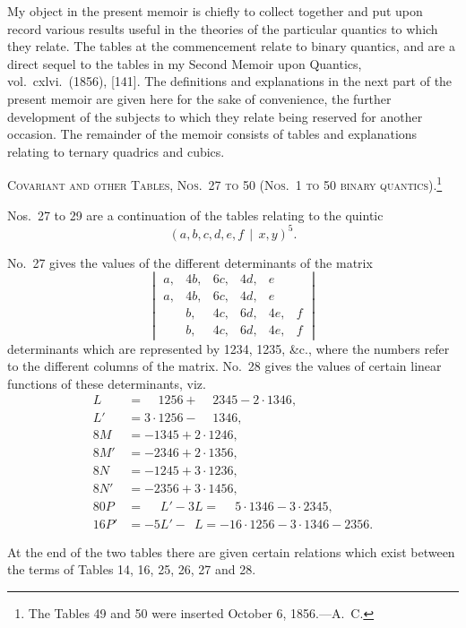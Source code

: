 \documentclass[11pt,a4paper]{article}
\begin{document}
My object in the present memoir is chiefly to collect together and put upon
record various results useful in the theories of the particular quantics to which
they relate. The tables at the commencement relate to binary quantics, and are a
direct sequel to the tables in my Second Memoir upon Quantics, vol.~cxlvi.~(1856), [141].
The definitions and explanations in the next part of the present memoir are given
here for the sake of convenience, the further development of the subjects to which
they relate being reserved for another occasion. The remainder of the memoir consists
of tables and explanations relating to ternary quadrics and cubics.

\bigskip
\noindent\textsc{Covariant and other Tables, Nos.~27 to 50 (Nos.~1 to 50 binary quantics).}\footnote{The Tables 49 and 50 were inserted October 6, 1856.---A.~C.}

Nos.~27 to 29 are a continuation of the tables relating to the quintic
\[(a, b, c, d, e, f \, \mid\, x, y)^5.\]

No.~27 gives the values of the different determinants of the matrix
\[
\begin{vmatrix}
a, & 4b, & 6c, & 4d, & e \\
a, & 4b, & 6c, & 4d, & e \\
  & b, & 4c, & 6d, & 4e, & f \\
  & b, & 4c, & 6d, & 4e, & f
\end{vmatrix}
\]
determinants which are represented by 1234, 1235, \&c., where the numbers refer to
the different columns of the matrix. No.~28 gives the values of certain linear
functions of these determinants, viz.
\begin{align*}
L &= \phantom{3\cdot}1256 + \phantom{2\cdot}2345 - 2\cdot 1346,\\
L' &= 3\cdot 1256 - \phantom{3\cdot}1346,\\
8M &= -1345 + 2\cdot 1246,\\
8M' &= -2346 + 2\cdot 1356,\\
8N &= -1245 + 3\cdot 1236,\\
8N' &= -2356 + 3\cdot 1456,\\
80P &= \phantom{-5}L' - 3L = \phantom{-}5\cdot 1346 - 3\cdot 2345,\\
16P' &= -5L' - \phantom{3}L = -16\cdot 1256 - 3\cdot 1346 - 2356.
\end{align*}

At the end of the two tables there are given certain relations which exist between
the terms of Tables 14, 16, 25, 26, 27 and 28.
\end{document}
